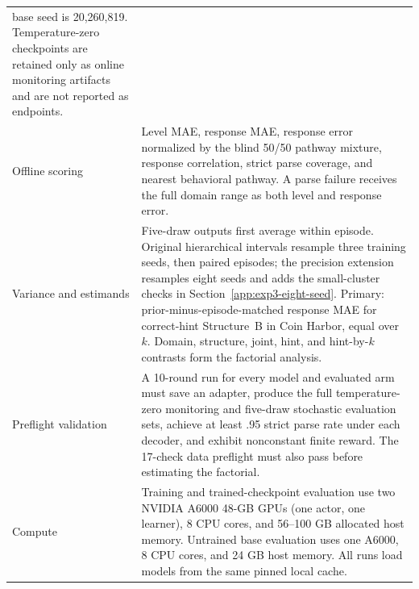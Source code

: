 \begin{center}
\begin{minipage}{\linewidth}
\begin{tabular}{p{.29\linewidth}p{.66\linewidth}}
base seed is 20,260,819. Temperature-zero checkpoints are retained only as
online monitoring artifacts and are not reported as endpoints. \\
Offline scoring & Level MAE, response MAE, response error normalized by the
blind 50/50 pathway mixture, response correlation, strict parse coverage, and
nearest behavioral pathway. A parse failure receives the full domain range as
both level and response error. \\
Variance and estimands & Five-draw outputs first average within episode.
Original hierarchical intervals resample three training seeds, then paired
episodes; the precision extension resamples eight seeds and adds the
small-cluster checks in Section~\ref{app:exp3-eight-seed}.
Primary: prior-minus-episode-matched response MAE for correct-hint Structure~B in Coin
Harbor, equal over $k$. Domain, structure, joint, hint, and hint-by-$k$ contrasts
form the factorial analysis. \\
Preflight validation & A 10-round run for every model and evaluated arm must
save an adapter, produce the full temperature-zero monitoring and five-draw
stochastic evaluation sets, achieve
at least .95 strict parse rate under each decoder, and exhibit nonconstant finite
reward. The 17-check data preflight must also pass before estimating the factorial. \\
Compute & Training and trained-checkpoint evaluation use two NVIDIA A6000 48-GB
GPUs (one actor, one learner), 8 CPU cores, and 56--100 GB allocated host memory.
Untrained base evaluation uses one A6000, 8 CPU cores, and 24 GB host memory.
All runs load models from the same pinned local cache. \\
\bottomrule
\end{tabular}
\end{minipage}
\end{center}

